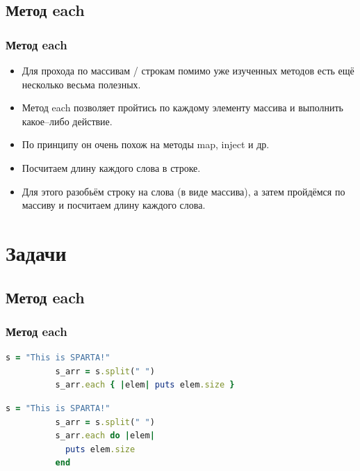 \documentclass[compress,red]{beamer}
\begin{document}
\subsection{Метод each}
\begin{frame}[fragile]
  \frametitle{Метод each}
		\begin{itemize}
		  \item Для прохода по массивам / строкам помимо уже изученных методов есть ещё несколько весьма полезных.
		  \item Метод each позволяет пройтись по каждому элементу массива и выполнить какое--либо действие.
		  \item По принципу он очень похож на методы map, inject и др.
		  \item Посчитаем длину каждого слова в строке.
		  \item Для этого разобьём строку на слова (в виде массива), а затем пройдёмся по массиву и посчитаем длину каждого слова.
    \end{itemize}
    
\end{frame}

\section{Задачи}

\subsection{Метод each}
\begin{frame}[fragile]
  
  \frametitle{Метод each}
  \scriptsize{
		\begin{lstlisting}[language=ruby,basicstyle=\footnotesize,label=ruby6,caption=Метод each --- краткая запись]
		  s = "This is SPARTA!"
		  s_arr = s.split(" ")
		  s_arr.each { |elem| puts elem.size }
	\end{lstlisting}
	}
  \scriptsize{
		\begin{lstlisting}[language=ruby,basicstyle=\footnotesize,label=ruby7,caption=Метод each --- полная запись]
		  s = "This is SPARTA!"
		  s_arr = s.split(" ")
		  s_arr.each do |elem|
		    puts elem.size
		  end
	\end{lstlisting}
	}

\end{frame}
\end{document}
